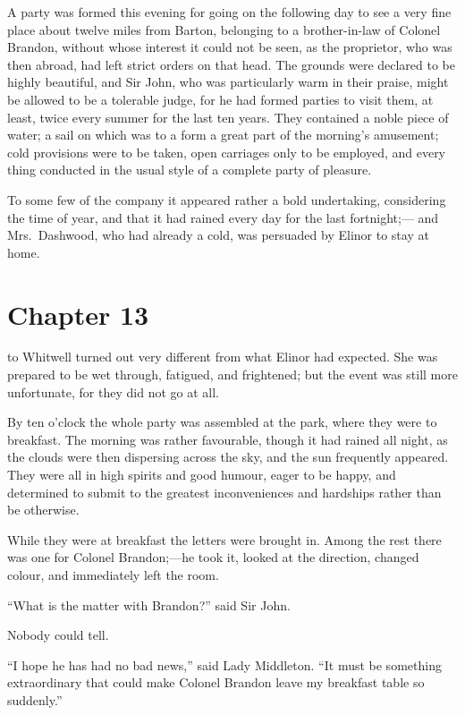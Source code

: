 A party was formed this evening for going on the
following day to see a very fine place about twelve miles
from Barton, belonging to a brother-in-law of Colonel Brandon,
without whose interest it could not be seen, as the proprietor,
who was then abroad, had left strict orders on that head.
The grounds were declared to be highly beautiful,
and Sir John, who was particularly warm in their praise,
might be allowed to be a tolerable judge, for he had
formed parties to visit them, at least, twice every summer
for the last ten years.  They contained a noble piece
of water; a sail on which was to a form a great part of
the morning's amusement; cold provisions were to be taken,
open carriages only to be employed, and every thing
conducted in the usual style of a complete party of pleasure.

To some few of the company it appeared rather
a bold undertaking, considering the time of year,
and that it had rained every day for the last fortnight;---%
and Mrs.\ Dashwood, who had already a cold, was persuaded
by Elinor to stay at home.



\chapter{Chapter 13}


 to Whitwell turned out
very different from what Elinor had expected.  She was
prepared to be wet through, fatigued, and frightened;
but the event was still more unfortunate, for they did
not go at all.

By ten o'clock the whole party was assembled at
the park, where they were to breakfast.  The morning
was rather favourable, though it had rained all night,
as the clouds were then dispersing across the sky,
and the sun frequently appeared.  They were all in high
spirits and good humour, eager to be happy, and determined
to submit to the greatest inconveniences and hardships
rather than be otherwise.

While they were at breakfast the letters were brought in.
Among the rest there was one for Colonel Brandon;---he
took it, looked at the direction, changed colour,
and immediately left the room.

``What is the matter with Brandon?'' said Sir John.

Nobody could tell.

``I hope he has had no bad news,'' said Lady Middleton.
``It must be something extraordinary that could make Colonel
Brandon leave my breakfast table so suddenly.''

